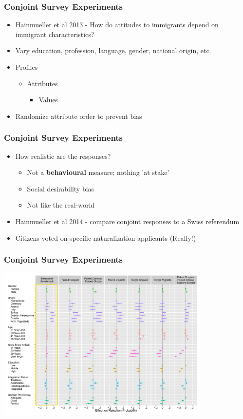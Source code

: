 \documentclass[xcolor=x11names,compress]{beamer}\usepackage[]{graphicx}\usepackage[]{xcolor}
\renewcommand{\(}{\begin{columns}}
\renewcommand{\)}{\end{columns}}
\newcommand{\<}[1]{\begin{column}{#1}}
\renewcommand{\>}{\end{column}}
\begin{document}
\begin{frame}
\frametitle{Conjoint Survey Experiments}
\begin{itemize}
\item Hainmueller et al 2013 - How do attitudes to immigrants depend on immigrant characteristics?
\pause
\item Vary education, profession, language, gender, national origin, etc.
\pause
\item Profiles
\begin{itemize}
\item Attributes
\begin{itemize}
\item Values
\pause
\end{itemize}
\end{itemize}
\item Randomize attribute order to prevent bias
\end{itemize}
\end{frame}





\begin{frame}
\frametitle{Conjoint Survey Experiments}
\begin{itemize}
\item How realistic are the responses?
\pause
\begin{itemize}
\item Not a \textbf{behavioural} measure; nothing 'at stake'
\pause
\item Social desirability bias
\pause
\item Not like the real-world
\pause
\end{itemize}
\item Hainmueller et al 2014 - compare conjoint responses to a Swiss referendum
\pause
\item Citizens voted on specific naturalization applicants (Really!)
\end{itemize}
\end{frame}

\begin{frame}
\frametitle{Conjoint Survey Experiments}
\includegraphics[width=0.8\textwidth]{Conjoint_Swiss.png}
\end{frame}
\end{document}
